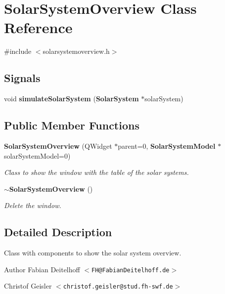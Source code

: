 \section{\-Solar\-System\-Overview \-Class \-Reference}
\label{df/d84/classSolarSystemOverview}


{\ttfamily \#include $<$solarsystemoverview.\-h$>$}

\subsection*{\-Signals}
\begin{DoxyCompactItemize}
\item 
void {\bfseries simulate\-Solar\-System} ({\bf \-Solar\-System} $\ast$solar\-System)\label{df/d84/classSolarSystemOverview_a3e4c6106618cf8f0fcf07f4b10961bf1}

\end{DoxyCompactItemize}
\subsection*{\-Public \-Member \-Functions}
\begin{DoxyCompactItemize}
\item 
{\bf \-Solar\-System\-Overview} (\-Q\-Widget $\ast$parent=0, {\bf \-Solar\-System\-Model} $\ast$solar\-System\-Model=0)
\begin{DoxyCompactList}\small\item\em \-Class to show the window with the table of the solar systems. \end{DoxyCompactList}\item 
{\bf $\sim$\-Solar\-System\-Overview} ()\label{df/d84/classSolarSystemOverview_ace010f7bb05bd114b9fbddda91a3631f}

\begin{DoxyCompactList}\small\item\em \-Delete the window. \end{DoxyCompactList}\end{DoxyCompactItemize}


\subsection{\-Detailed \-Description}
\-Class with components to show the solar system overview.

\begin{DoxyAuthor}{\-Author}
\-Fabian \-Deitelhoff $<${\tt \-F\-H@\-Fabian\-Deitelhoff.\-de}$>$ 

\-Christof \-Geisler $<${\tt christof.\-geisler@stud.\-fh-\/swf.\-de}$>$ 
\end{DoxyAuthor}


